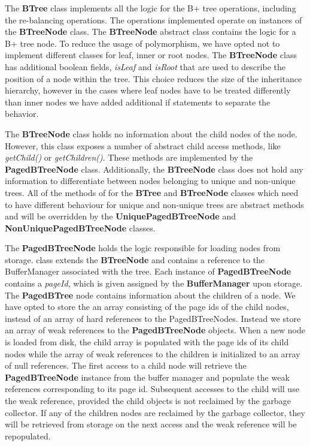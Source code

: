 \documentclass[11pt,a4paper,oneside]{article}
\begin{document}
The \textbf{BTree} class implements all the logic for the B+ tree operations, including the re-balancing operations. The operations implemented operate on instances of the \textbf{BTreeNode} class. The \textbf{BTreeNode} abstract class contains the logic for a B+ tree node. To reduce the usage of polymorphism, we have opted not to implement different classes for leaf, inner or root nodes. The \textbf{BTreeNode} class has additional boolean fields, \textit{isLeaf} and \textit{isRoot} that are used to describe the position of a node within the tree. This choice reduces the size of the inheritance hierarchy, however in the cases where leaf nodes have to be treated differently than inner nodes we have added additional if statements to separate the behavior. 

The \textbf{BTreeNode} class holds no information about the child nodes of the node. However, this class exposes a number of abstract child access methods, like \textit{getChild()} or \textit{getChildren()}. These methods are implemented by the \textbf{PagedBTreeNode} class. Additionally, the \textbf{BTreeNode} class does not hold any information to differentiate between nodes belonging to unique and non-unique trees. All of the methods of for the \textbf{BTree} and \textbf{BTreeNode} classes which need to have different behaviour for unique and non-unique trees are abstract methods and will be overridden by the \textbf{UniquePagedBTreeNode} and \textbf{NonUniquePagedBTreeNode} classes.

The \textbf{PagedBTreeNode} holds the logic responsible for loading nodes from storage. class extends the \textbf{BTreeNode} and contains a reference to the BufferManager associated with the tree. Each instance of \textbf{PagedBTreeNode} contains a \textit{pageId}, which is given assigned by the \textbf{BufferManager} upon storage. The \textbf{PagedBTree} node contains information about the children of a node. We have opted to store the an array consisting of the page ids of the child nodes, instead of an array of hard references to the PagedBTreeNodes. Instead we store an array of weak references to the \textbf{PagedBTreeNode} objects. When a new node is loaded from disk, the child array is populated with the page ids of its child nodes while the array of weak references to the children is initialized to an array of null references. The first access to a child node will retrieve the \textbf{PagedBTreeNode} instance from the buffer manager and populate the weak references corresponding to its page id. Subsequent accesses to the child will use the weak reference, provided the child objects is not reclaimed by the garbage collector. If any of the children nodes are reclaimed by the garbage collector, they will be retrieved from storage on the next access and the weak reference will be repopulated.
\end{document}
